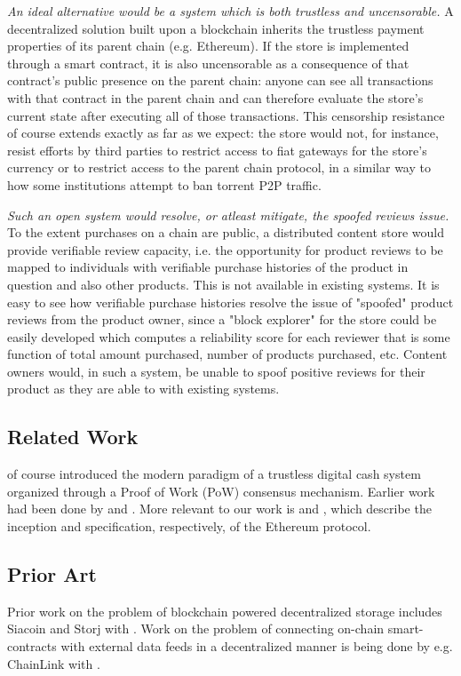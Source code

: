 \documentclass[12pt,oneside]{amsart}
\makeatletter
\newcommand*\ie{i.e.\@\xspace}
\makeatother
\begin{document}
\begin{multicols}{2}
\textit{An ideal alternative would be a system which is both trustless and uncensorable.}
A decentralized solution built upon a blockchain inherits the trustless payment properties of its parent chain (e.g. Ethereum).
If the store is implemented through a smart contract, it is also uncensorable as a consequence of that contract's public presence on the parent chain: anyone can see all transactions with that contract in the parent chain and can therefore evaluate the store's current state after executing all of those transactions.
This censorship resistance of course extends exactly as far as we expect: the store would not, for instance, resist efforts by third parties to restrict access to fiat gateways for the store's currency or to restrict access to the parent chain protocol, in a similar way to how some institutions attempt to ban torrent P2P traffic.

\textit{Such an open system would resolve, or atleast mitigate, the spoofed reviews issue.}
To the extent purchases on a chain are public, a distributed content store would provide verifiable review capacity, \ie the opportunity for product reviews to be mapped to individuals with verifiable purchase histories of the product in question and also other products.
This is not available in existing systems.
It is easy to see how verifiable purchase histories resolve the issue of "spoofed" product reviews from the product owner, since a "block explorer" for the store could be easily developed which computes a reliability score for each reviewer that is some function of total amount purchased, number of products purchased, etc.
Content owners would, in such a system, be unable to spoof positive reviews for their product as they are able to with existing systems.

\subsection{Related Work} \label{ch:previous}

\cite{nakamoto2008bitcoin} of course introduced the modern paradigm of a trustless digital cash system organized through a Proof of Work (PoW) consensus mechanism.
Earlier work had been done by \cite{dwork92pricingvia} and \cite{back2002hashcash}.
More relevant to our work is \cite{buterin2013ethereum} and \cite{wood2015ethereum}, which describe the inception and specification, respectively, of the Ethereum protocol.

\subsection{Prior Art} \label{ch:previous}
Prior work on the problem of blockchain powered decentralized storage includes Siacoin and Storj with \cite{wilkinson2016storj}.
Work on the problem of connecting on-chain smart-contracts with external data feeds in a decentralized manner is being done by e.g. ChainLink with \cite{ellis2017link}.


\end{multicols}
\end{document}
